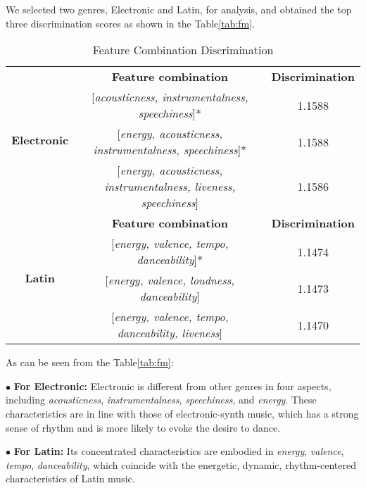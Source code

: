 \documentclass[12pt]{article}  %
\begin{document}
We selected two genres, Electronic and Latin, for analysis, and obtained the top three discrimination scores as shown in the Table\eqref{tab:fm}.

\vspace{-0.3cm}
\begin{table}[htbp]
	\centering
	\caption{Feature Combination Discrimination}\label{tab:fm}
	\begin{tabular}{c|c|c}
		\hline
		\hline
		\multirow{4}[8]{*}{\textbf{Electronic}} & \textbf{Feature combination}    & \textbf{Discrimination} \\
		\cline{2-3}                         & [\emph{acousticness, instrumentalness, speechiness}]* & 1.1588 \\
		\cline{2-3}                         & [\emph{energy, acousticness, instrumentalness, speechiness}]* & 1.1588 \\
		\cline{2-3}                         & [\emph{energy, acousticness, instrumentalness, liveness, speechiness}] & 1.1586 \\
		\hline
		\hline
		\multirow{4}[7]{*}{\textbf{Latin}} & \textbf{Feature combination}    & \textbf{Discrimination} \\
		\cline{2-3}                         & [\emph{energy, valence, tempo, danceability}]* & 1.1474 \\
		\cline{2-3}                         & [\emph{energy, valence, loudness, danceability}] & 1.1473 \\
		\cline{2-3}                         & [\emph{energy, valence, tempo, danceability, liveness}] & 1.1470\\
		\hline\hline
	\end{tabular}%
	\label{tab:addlabel}%
\end{table}%

\vspace{-0.3cm}
As can be seen from the Table\eqref{tab:fm}:

$\bullet$ \textbf{For Electronic: }Electronic is different from other genres in four aspects, including \emph{acousticness}, \emph{instrumentalness}, \emph{speechiness}, and \emph{energy}. These characteristics are in line with those of electronic-synth music, which has a strong sense of rhythm and is more likely to evoke the desire to dance.

$\bullet$ \textbf{For Latin: }Its concentrated characteristics are embodied in \emph{energy}, \emph{valence}, \emph{tempo}, \emph{danceability}, which coincide with the energetic, dynamic, rhythm-centered characteristics of Latin music.
\end{document}
